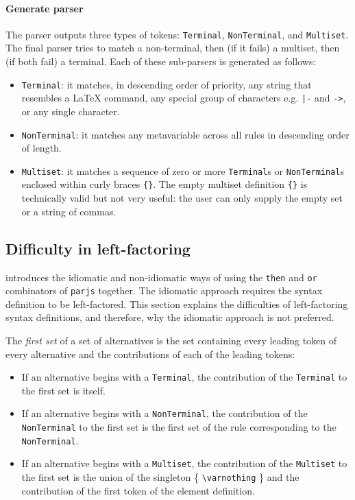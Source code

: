 \paragraph{Generate parser}
The parser outputs three types of tokens: \lstinline{Terminal}, \lstinline{NonTerminal}, and \lstinline{Multiset}. The final parser tries to match a non-terminal, then (if it fails) a multiset, then (if both fail) a terminal. Each of these sub-parsers is generated as follows:
\begin{itemize}
    \item \lstinline{Terminal}: it matches, in descending order of priority, any string that resembles a \LaTeX{} command, any special group of characters e.g. \lstinline{|-} and \lstinline{->}, or any single character.
    \item \lstinline{NonTerminal}: it matches any metavariable across all rules in descending order of length.
    \item \lstinline{Multiset}: it matches a sequence of zero or more \lstinline{Terminal}s or \lstinline{NonTerminal}s enclosed within curly braces \lstinline|{}|. The empty multiset definition \lstinline|{}| is technically valid but not very useful: the user can only supply the empty set or a string of commas.
\end{itemize}

\subsection{Difficulty in left-factoring}
\label{syntax:factorisation}
 introduces the idiomatic and non-idiomatic ways of using the \lstinline{then} and \lstinline{or} combinators of \lstinline{parjs} together. The idiomatic approach requires the syntax definition to be left-factored. This section explains the difficulties of left-factoring syntax definitions, and therefore, why the idiomatic approach is not preferred.

\begin{definition}
    The \textit{first set} of a set of alternatives is the set containing every leading token of every alternative and the contributions of each of the leading tokens:
    \begin{itemize}
        \item If an alternative begins with a \lstinline{Terminal}, the contribution of the \lstinline{Terminal} to the first set is itself.
        \item If an alternative begins with a \lstinline{NonTerminal}, the contribution of the \lstinline{NonTerminal} to the first set is the first set of the rule corresponding to the \lstinline{NonTerminal}.
        \item If an alternative begins with a \lstinline{Multiset}, the contribution of the \lstinline{Multiset} to the first set is the union of the singleton \{ \lstinline{\varnothing} \} and the contribution of the first token of the element definition.
    \end{itemize}
\end{definition}

